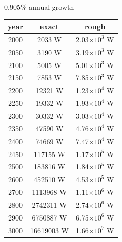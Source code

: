 \documentclass[a4paper]{article}
\begin{document}
	\noindent
	\begin{minipage}{0.5\textwidth}
		
		\begin{center}
			0.905\% annual growth
			
			\medskip
			
			\small
			\begin{tabular}{c | c | c}
				year & exact & rough\\\hline
				2000 & 2033 W & 2.03$\times 10^{3}$ W \\\hline
				2050 & 3190 W & 3.19$\times 10^{3}$ W \\\hline
				2100 & 5005 W & 5.01$\times 10^{3}$ W \\\hline
				2150 & 7853 W & 7.85$\times 10^{3}$ W \\\hline
				2200 & 12321 W & 1.23$\times 10^{4}$ W \\\hline
				2250 & 19332 W & 1.93$\times 10^{4}$ W \\\hline
				2300 & 30332 W & 3.03$\times 10^{4}$ W \\\hline
				2350 & 47590 W & 4.76$\times 10^{4}$ W \\\hline
				2400 & 74669 W & 7.47$\times 10^{4}$ W \\\hline
				2450 & 117155 W & 1.17$\times 10^{5}$ W \\\hline
				2500 & 183816 W & 1.84$\times 10^{5}$ W \\\hline
				2600 & 452510 W & 4.53$\times 10^{5}$ W \\\hline
				2700 & 1113968 W & 1.11$\times 10^{6}$ W \\\hline
				2800 & 2742311 W & 2.74$\times 10^{6}$ W \\\hline
				2900 & 6750887 W & 6.75$\times 10^{6}$ W \\\hline
				3000 & 16619003 W & 1.66$\times 10^{7}$ W
			\end{tabular}
		\end{center}
	\end{minipage}\vline\nobreak
\end{document}
